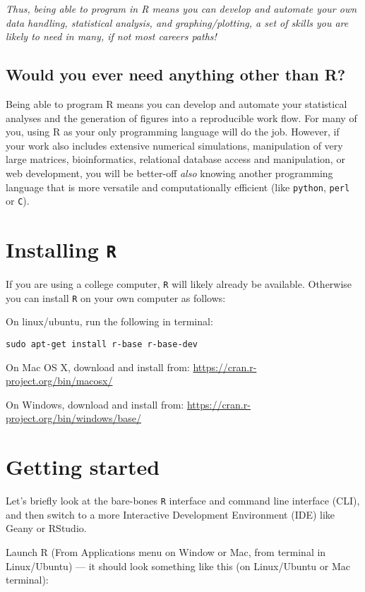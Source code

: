{\it Thus, being able to program in R means you can develop and 
automate your own data handling, statistical analysis, and 
graphing/plotting, a set of skills you are likely to need in many, if 
not most careers paths!}

\subsection{Would you ever need anything other than {R}?} 

Being able to program R means you can develop and automate your 
statistical analyses and the generation of figures into a reproducible 
work flow. For many of you, using R as your only programming 
language will do the job. However, if your work also includes 
extensive numerical simulations, manipulation of very large matrices, 
bioinformatics, relational database access and manipulation, or web 
development, you will be better-off {\it also} knowing another 
programming language that is more versatile and computationally 
efficient (like {\tt python}, {\tt perl} or {\tt C}).

\section{Installing {\tt R}}

If you are using a college computer, {\tt R} will likely already be 
available. Otherwise you can install {\tt R} on your own computer as 
follows:  

On linux/ubuntu, run the following in terminal:
\begin{lstlisting}
sudo apt-get install r-base r-base-dev
\end{lstlisting}

On Mac OS X, download and install from:
\url{https://cran.r-project.org/bin/macosx/}

On Windows, download and install from:
\url{https://cran.r-project.org/bin/windows/base/}

\section{Getting started}

Let's briefly look at the bare-bones {\tt R} interface and command line 
interface (CLI), and then switch to a more Interactive Development 
Environment (IDE) like Geany or RStudio. 

Launch R (From Applications menu on Window or Mac, from terminal in 
Linux/Ubuntu) --- it should look something like this (on Linux/Ubuntu 
or Mac terminal):

